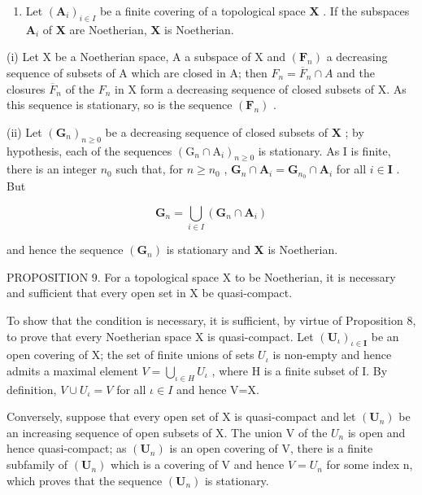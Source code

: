 \begin{enumerate}
\def\labelenumi{(\roman{enumi})}
\setcounter{enumi}{1}
\item
  Let \((\mathbf{A}_i)_{i\in I}\) be a finite covering of a topological space \(\mathbf{X}\) . If the subspaces \(\mathbf{A}_i\) of \(\mathbf{X}\) are Noetherian, \(\mathbf{X}\) is Noetherian.

\end{enumerate}

(i) Let X be a Noetherian space, A a subspace of X and \((\mathbf{F}_{n})\) a decreasing sequence of subsets of A which are closed in A; then \(F_{n} = \overline{F}_{n} \cap A\) and the closures \(\overline{F}_{n}\) of the \(F_{n}\) in X form a decreasing sequence of closed subsets of X. As this sequence is stationary, so is the sequence \((\mathbf{F}_{n})\) .

(ii) Let \((\mathbf{G}_n)_{n\geqslant 0}\) be a decreasing sequence of closed subsets of \(\mathbf{X}\) ; by hypothesis, each of the sequences \((\mathrm{G}_n\cap \mathrm{A}_i)_{n\geqslant 0}\) is stationary. As I is finite, there is an integer \(n_0\) such that, for \(n\geqslant n_0\) , \(\mathbf{G}_n\cap \mathbf{A}_i = \mathbf{G}_{n_0}\cap \mathbf{A}_i\) for all \(i\in \mathbf{I}\) . But

\[
\mathbf {G} _ {n} = \bigcup_ {i \in I} \left(\mathbf {G} _ {n} \cap \mathbf {A} _ {i}\right)
\]

and hence the sequence \((\mathbf{G}_n)\) is stationary and \(\mathbf{X}\) is Noetherian.

PROPOSITION 9. For a topological space X to be Noetherian, it is necessary and sufficient that every open set in X be quasi-compact.

To show that the condition is necessary, it is sufficient, by virtue of Proposition 8, to prove that every Noetherian space X is quasi-compact. Let \((\mathbf{U}_{\iota})_{\iota\in\mathbf{I}}\) be an open covering of X; the set of finite unions of sets \(U_{\iota}\) is non-empty and hence admits a maximal element \(V=\bigcup_{\iota\in H}U_{\iota}\) , where H is a finite subset of I. By definition, \(V\cup U_{\iota}=V\) for all \(\iota\in I\) and hence V=X.

Conversely, suppose that every open set of X is quasi-compact and let \((\mathbf{U}_{n})\) be an increasing sequence of open subsets of X. The union V of the \(U_{n}\) is open and hence quasi-compact; as \((\mathbf{U}_{n})\) is an open covering of V, there is a finite subfamily of \((\mathbf{U}_{n})\) which is a covering of V and hence \(V = U_{n}\) for some index n, which proves that the sequence \((\mathbf{U}_{n})\) is stationary.

